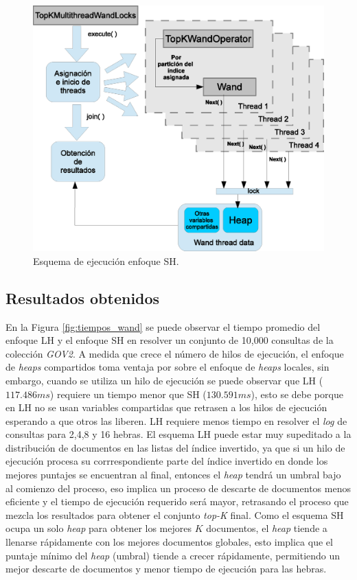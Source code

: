 \begin{figure}[th!]
\centering
\includegraphics[scale=.75]{images/ejecucion_topkmultithreadwandopCOMPARTIDO.eps}
\caption{Esquema de ejecución enfoque SH.}
\label{fig:esquema_ejecucion_wandsh}
\end{figure}


\subsection{Resultados obtenidos}
\label{evaluacionexperimental:resultadosObtenidos}
En la Figura \ref{fig:tiempos_wand} se puede observar el tiempo promedio del enfoque LH y el enfoque SH en resolver un conjunto de 10,000 consultas de la colección \textit{GOV2}. A medida que crece el número de hilos de ejecución, el enfoque de \textit{heaps} compartidos toma ventaja por sobre el enfoque de \textit{heaps} locales, sin embargo, cuando se utiliza un hilo de ejecución se puede observar que LH ($117.486 ms$) requiere un tiempo menor que SH ($130.591 ms$), esto se debe porque en LH no se usan variables compartidas que retrasen a los hilos de ejecución esperando a que otros las liberen. LH requiere menos tiempo en resolver el \textit{log} de consultas para 2,4,8 y 16 hebras. 
El esquema LH puede estar muy supeditado a la distribución de documentos en las listas del índice invertido, ya que si un hilo de ejecución procesa su corrrespondiente parte del índice invertido en donde los mejores puntajes se encuentran al final, entonces el \textit{heap} tendrá un umbral bajo al comienzo del proceso, eso implica un proceso de descarte de documentos menos eficiente y el tiempo de ejecución requerido será mayor, retrasando el proceso que mezcla los resultados para obtener el conjunto \textit{top-K} final. 
Como el esquema SH ocupa un solo \textit{heap} para obtener los mejores $K$ documentos, el \textit{heap} tiende a llenarse rápidamente con los mejores documentos globales, esto implica que el puntaje mínimo del \textit{heap} (umbral) tiende a crecer rápidamente, permitiendo un mejor descarte de documentos y menor tiempo de ejecución para las hebras. 

